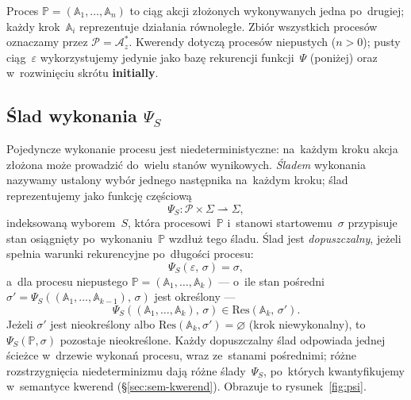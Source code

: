 \documentclass[11pt,a4paper]{article}
\newcommand{\initially}{\textbf{initially}}
\theoremstyle{definition}
\begin{document}
Proces $\mathbb{P} = (\mathbb{A}_1, \ldots, \mathbb{A}_n)$ to ciąg akcji złożonych
wykonywanych jedna po~drugiej; każdy krok~$\mathbb{A}_i$ reprezentuje działania równoległe.
Zbiór wszystkich procesów oznaczamy przez $\mathcal{P} = \mathcal{A}_z^*$. Kwerendy dotyczą
procesów niepustych ($n>0$); pusty ciąg~$\varepsilon$ wykorzystujemy jedynie jako bazę
rekurencji funkcji~$\Psi$ (poniżej) oraz w~rozwinięciu skrótu \initially{}.

\subsection{Ślad wykonania \texorpdfstring{$\Psi_S$}{Psi\_S}}

Pojedyncze wykonanie procesu jest niedeterministyczne: na~każdym kroku akcja złożona może prowadzić do~wielu stanów wynikowych. \emph{Śladem} wykonania nazywamy ustalony wybór jednego następnika na~każdym kroku; ślad reprezentujemy jako funkcję częściową
\[
  \Psi_S : \mathcal{P} \times \Sigma \rightharpoonup \Sigma,
\]
indeksowaną wyborem~$S$, która procesowi~$\mathbb{P}$ i~stanowi startowemu~$\sigma$ przypisuje stan osiągnięty po~wykonaniu~$\mathbb{P}$ wzdłuż tego śladu. Ślad jest \emph{dopuszczalny}, jeżeli spełnia warunki rekurencyjne po~długości procesu:
\[
  \Psi_S(\varepsilon,\,\sigma) = \sigma,
\]
a~dla procesu niepustego $\mathbb{P} = (\mathbb{A}_1,\ldots,\mathbb{A}_k)$ --- o~ile stan pośredni $\sigma' = \Psi_S((\mathbb{A}_1,\ldots,\mathbb{A}_{k-1}),\,\sigma)$ jest określony ---
\[
  \Psi_S((\mathbb{A}_1,\ldots,\mathbb{A}_k),\,\sigma) \in \mathrm{Res}(\mathbb{A}_k,\,\sigma') .
\]
Jeżeli $\sigma'$ jest nieokreślony albo $\mathrm{Res}(\mathbb{A}_k,\sigma') = \varnothing$ (krok niewykonalny), to $\Psi_S(\mathbb{P},\sigma)$ pozostaje nieokreślone. Każdy dopuszczalny ślad odpowiada jednej ścieżce w~drzewie wykonań procesu, wraz ze~stanami pośrednimi; różne rozstrzygnięcia niedeterminizmu dają różne ślady~$\Psi_S$, po~których kwantyfikujemy w~semantyce kwerend (\S\ref{sec:sem-kwerend}). Obrazuje to rysunek~\ref{fig:psi}.
\end{document}
